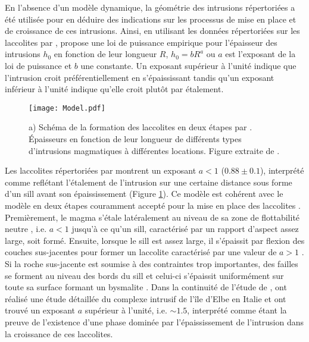 En  l'absence  d'un  modèle  dynamique, la  géométrie  des  intrusions
répertoriées a  été utilisée pour  en déduire des indications  sur les
processus de mise en place et de croissance de ces intrusions.  Ainsi,
en  utilisant   les  données  répertoriées  sur   les  laccolites  par
\citet{E:2015tl},   \citet{McCaffrey:1997ea}   propose  une   loi   de
puissance empirique pour l'épaisseur  des intrusions $h_0$ en fonction
de leur longueur $R$, $h_0 = bR^a$  ou $a$ est l'exposant de la loi de
puissance  et $b$  une  constante.  Un  exposant  supérieur à  l'unité
indique  que l'intrusion  croit  préférentiellement en  s'épaississant
tandis qu'un exposant inférieur à l'unité indique qu'elle croit plutôt
par étalement.

\begin{figure}[htpb]
  \begin{center}
    \graphicspath{ {/Users/thorey/Documents/These/Manuscript/Figure/Chapter1/} }
    \texttt{[image: Model.pdf]}
    \caption{a) Schéma de  la formation des laccolites  en deux étapes
      par  \citet{McCaffrey:1997ea}.  Épaisseurs  en fonction  de leur
      longueur   de  différents   types  d'intrusions   magmatiques  à
      différentes locations.  Figure extraite de \citet{Cruden:tg}.}
    \label{Model}
  \end{center}
\end{figure}

Les laccolites répertoriées par  \citet{E:2015tl} montrent un exposant
$a<1$  ($0.88 \pm  0.1$),  interprété comme  reflétant l'étalement  de
l'intrusion sur une  certaine distance sous forme d'un  sill avant son
épaississement (Figure  \ref{Model}). Ce  modèle est cohérent  avec le
modèle en  deux étapes couramment  accepté pour  la mise en  place des
laccolites \citep{Johnson:1973ho,McCaffrey:1997ea}.   Premièrement, le
magma s'étale latéralement au niveau de sa zone de flottabilité neutre
,  i.e.  $a<1$  jusqu'à  ce  qu'un sill,  caractérisé  par un  rapport
d'aspect assez large, soit formé.   Ensuite, lorsque le sill est assez
large, il s'épaissit par flexion  des couches sus-jacentes pour former
un    laccolite    caractérisé    par     une    valeur    de    $a>1$
\citep{Johnson:1973ho,Koch:1981if}.   Si  la   roche  sus-jacente  est
soumise à des contraintes trop  importantes, des failles se forment au
niveau des bords du sill et celui-ci s'épaissit uniformément sur toute
sa surface formant un  bysmalite \citep{E:2015tl}.  Dans la continuité
de  l'étude  de  \citet{McCaffrey:1997ea},  \citet{Rocchi:2002jy}  ont
réalisé une  étude détaillée du  complexe intrusif de l'île  d'Elbe en
Italie  et  ont trouvé  un  exposant  $a$  supérieur à  l'unité,  i.e.
$\sim  1.5$, interprété  comme étant  la preuve  de l'existence  d'une
phase dominée  par l'épaississement de l'intrusion  dans la croissance
de ces laccolites.

